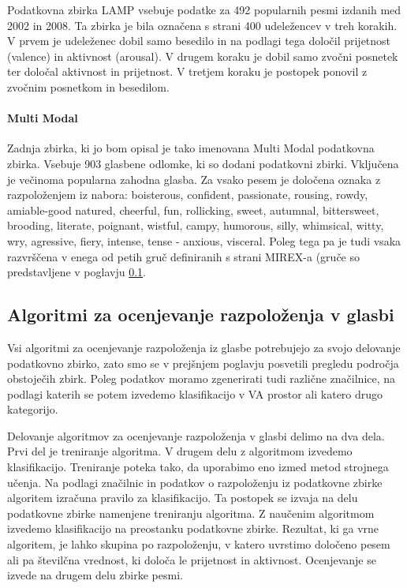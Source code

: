 \documentclass[a4paper, 12pt]{book}
\begin{document}
{Podatkovna zbirka LAMP \cite{chu2010lamp} vsebuje podatke za 492 popularnih pesmi izdanih med 2002 in 2008. Ta zbirka je bila označena s strani 400 udeležencev v treh korakih. V prvem je udeleženec dobil samo besedilo in  na podlagi tega določil prijetnost (valence) in aktivnost (arousal). V drugem koraku je dobil samo zvočni posnetek ter določal aktivnost in prijetnost. V tretjem koraku je postopek ponovil z zvočnim posnetkom in besedilom.

\paragraph{Multi Modal}

Zadnja zbirka, ki jo bom opisal je tako imenovana Multi Modal \cite{panda2013multi} podatkovna zbirka. Vsebuje 903 glasbene odlomke, ki so dodani podatkovni zbirki. Vključena je večinoma popularna zahodna glasba. Za vsako pesem je določena oznaka z razpoloženjem iz nabora: boisterous, confident, passionate, rousing, rowdy, amiable-good natured, cheerful, fun, rollicking, sweet, autumnal, bittersweet, brooding, literate, poignant, wistful, campy, humorous, silly, whimsical, witty, wry, agressive, fiery, intense, tense - anxious, visceral. Poleg tega pa je tudi vsaka razvrščena v enega od petih gruč definiranih s strani MIREX-a (gruče so predstavljene v poglavju \ref{algoritmisp}. 

\subsection{Algoritmi za ocenjevanje razpoloženja v glasbi} 
\label{algoritmisp}

Vsi algoritmi za ocenjevanje razpoloženja iz glasbe potrebujejo za svojo delovanje podatkovno zbirko, zato smo se v prejšnjem poglavju posvetili pregledu področja obstoječih zbirk. Poleg podatkov moramo zgenerirati tudi različne značilnice, na podlagi katerih se potem izvedemo klasifikacijo v VA prostor ali katero drugo kategorijo.

Delovanje algoritmov za ocenjevanje razpoloženja v glasbi delimo na dva dela. Prvi del je treniranje algoritma. V drugem delu z algoritmom  izvedemo klasifikacijo. Treniranje poteka tako, da uporabimo eno izmed metod strojnega učenja. Na podlagi značilnic in podatkov o razpoloženju iz podatkovne zbirke algoritem izračuna pravilo za klasifikacijo. Ta postopek se izvaja na delu podatkovne zbirke namenjene treniranju algoritma. Z naučenim algoritmom izvedemo klasifikacijo na preostanku podatkovne zbirke. Rezultat, ki ga vrne algoritem, je lahko skupina po razpoloženju, v katero uvrstimo določeno pesem ali pa številčna vrednost, ki določa le prijetnost in aktivnost. Ocenjevanje se izvede na drugem delu zbirke pesmi. 

}
\end{document}
